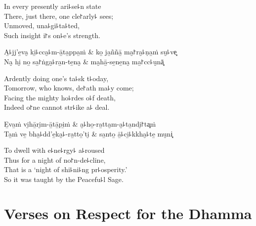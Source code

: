 \begin{english}
  In every presently ari꜕se꜕n state\\
  There, just there, one cle꜓arly꜕ sees;\\
  Unmoved, una꜕gi꜕ta꜕ted,\\
  Such insight i꜓s on꜕e's strength.
\end{english}

\begin{twochants}
  A̱꜕jj'e̱va̮ ki̱꜕cca̮꜕m-ā̱ta̱ppa̱ṁ & ko̱ ja̱ññā̱ ma̮꜓ra̮꜕ṇa̱ṁ su̮꜕ve͓ \\
  Na̮ hi̮ no̱ sa̱꜓ṅga̮꜕ra̱n-te̱na̮ & ma̮hā̱-se̱ne̱na̮ ma̱꜓cc꜕u̮nā͓ \\
\end{twochants}

\begin{english}
  Ardently doing one's ta꜕sk t꜕oday,\\
  Tomorrow, who knows, de꜓ath ma꜕y come;\\
  Facing the mighty ho꜕rdes o꜕f death,\\
  Indeed o꜓ne cannot str꜕ike a꜕ deal.
\end{english}

\clearpage

\begin{twochants}
  E̱va̱ṁ vi̮hā̱ri̮m-ā̱tā̱pi̱ṁ & a̮꜕ho̱-ra̱tta̮m-a̮꜕ta̱ndi̮꜓ta͓ṁ \\
  Ta̱ṁ ve̱ bha̱꜕dd'e̱ka̮꜕-ra̱tto̱'ti̮ & sa̱nto̱ ā̱꜕ci̱꜕kkha̮꜕te̱ mu̮ni͓ \\
\end{twochants}

\begin{english}
  To dwell with e꜕ne꜕rgy꜕ a꜕roused\\
  Thus for a night of no꜓n-de꜕cline,\\
  That is a `night of shi꜕ni꜕ng pr꜕osperity.'\\
  So it was taught by the Peacefu꜕l Sage.
\end{english}

\chapter{Verses on Respect for the Dhamma}


\begin{leader}
\end{leader}

